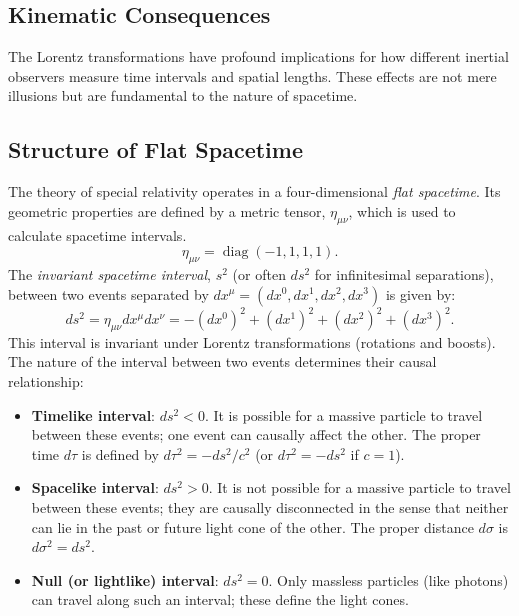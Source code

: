 \documentclass{amsart}
\theoremstyle{definition}
\theoremstyle{remark}
\DeclareMathOperator{\diag}{diag}
\begin{document}
\subsection{Kinematic Consequences}
\label{subsec:sr_kinematics}
The Lorentz transformations have profound implications for how different inertial observers measure time intervals and spatial lengths.
These effects are not mere illusions but are fundamental to the nature of spacetime.

\subsection{Structure of Flat Spacetime}
\label{subsec:sr_structure}
The theory of special relativity operates in a four-dimensional \emph{flat spacetime}.
Its geometric properties are defined by a metric tensor, $\eta_{\mu\nu}$, which is used to calculate spacetime intervals.
\begin{equation*}
  \eta_{\mu\nu} = \diag(-1,1,1,1).
\end{equation*}
The \emph{invariant spacetime interval}, $s^2$ (or often $ds^2$ for infinitesimal separations), between two events separated by $dx^\mu = (dx^0, dx^1, dx^2, dx^3)$ is given by:
\begin{equation*}
  ds^2 = \eta_{\mu\nu} dx^\mu dx^\nu = -(dx^0)^2 + (dx^1)^2 + (dx^2)^2 + (dx^3)^2.
\end{equation*}
This interval is invariant under Lorentz transformations (rotations and boosts).
The nature of the interval between two events determines their causal relationship:
\begin{itemize}
    \item \textbf{Timelike interval}: $ds^2 < 0$.
    It is possible for a massive particle to travel between these events; one event can causally affect the other.
    The proper time $d\tau$ is defined by $d\tau^2 = -ds^2/c^2$ (or $d\tau^2 = -ds^2$ if $c=1$).
    \item \textbf{Spacelike interval}: $ds^2 > 0$.
    It is not possible for a massive particle to travel between these events; they are causally disconnected in the sense that neither can lie in the past or future light cone of the other.
    The proper distance $d\sigma$ is $d\sigma^2 = ds^2$.
    \item \textbf{Null (or lightlike) interval}: $ds^2 = 0$.
    Only massless particles (like photons) can travel along such an interval; these define the light cones.
\end{itemize}
\end{document}
